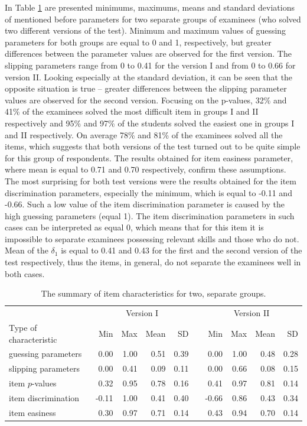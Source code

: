 \documentclass[english]{pwr_wmat_praca_dyplomowa}
\theoremstyle{plain}
\theoremstyle{definition}
\numberwithin{theorem}{chapter}
\begin{document}
In Table \ref{tab:item_param_gr} are presented minimums, maximums, means and standard deviations of mentioned before parameters for two separate groups of examinees (who solved two different versions of the test). Minimum and maximum values of guessing parameters for both groups are equal to 0 and 1, respectively, but greater differences between the parameter values are observed for the first version. The slipping parameters range from 0 to 0.41 for the version I and from 0 to 0.66 for version II. Looking especially at the standard deviation, it can be seen that the opposite situation is true -- greater differences between the slipping parameter values are observed for the second version. Focusing on the p-values, 32\% and 41\% of the examinees solved the most difficult item in groups I and II respectively and 95\% and 97\% of the students solved the easiest one in groups I and II respectively. On average 78\% and 81\% of the examinees solved all the items, which suggests that both versions of the test turned out to be quite simple for this group of respondents. The results obtained for item easiness parameter, where mean is equal to 0.71 and 0.70 respectively, confirm these assumptions. The most surprising for both test versions were the results obtained for the item discrimination parameters, especially the minimum, which is equal to -0.11 and -0.66. Such a low value of the item discrimination parameter is caused by the high guessing parameters (equal 1). The item discrimination parameters in such cases can be interpreted as equal 0, which means that for this item it is impossible to separate examinees possessing relevant skills and those who do not. Mean of the $\delta_1$ is equal to 0.41 and 0.43 for the first and the second version of the test respectively, thus the items, in general, do not separate the examinees well in both cases.

\begin{table}[H]
	\centering
	\begin{tabular}{l r r r r c r r r r} 
		\hline
		{\rule{0pt}{3ex}} & \multicolumn{4}{c}{Version I} & & \multicolumn{4}{c}{Version II} \\
		Type of characteristic & Min & Max & Mean & SD &  & Min & Max & Mean & SD \\
		\hline
		{\rule{0pt}{3ex}}guessing parameters  & 0.00 & 1.00 & 0.51 & 0.39 &  & 0.00 & 1.00 & 0.48 & 0.28 \\
		slipping parameters & 0.00 & 0.41 & 0.09 & 0.11 &  & 0.00 & 0.66 & 0.08 & 0.15 \\ 
		item $p$-values & 0.32 & 0.95 & 0.78 & 0.16 &  & 0.41 & 0.97 & 0.81 & 0.14 \\ 
		item discrimination & -0.11 & 1.00 & 0.41 & 0.40 &  & -0.66 & 0.86 & 0.43 & 0.34 \\ 
		item easiness & 0.30 & 0.97 & 0.71 & 0.14 &  & 0.43 & 0.94 & 0.70 & 0.14\\ [0.5ex] 
		\hline
	\end{tabular}
	\caption{The summary of item characteristics for two, separate groups.}
	\label{tab:item_param_gr} 
\end{table}
\end{document}

